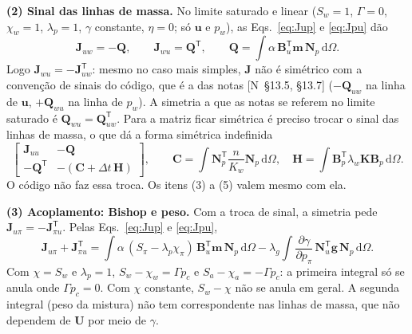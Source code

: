 \documentclass[11pt,a4paper]{article}
\numberwithin{equation}{section}
\newcommand{\dd}{\mathrm{d}}
\newcommand{\nota}[1]{{\footnotesize\textsf{[N~#1]}}}
\begin{document}
\textbf{(2) Sinal das linhas de massa.} No limite saturado e linear ($S_w=1$, $\Gamma=0$, $\chi_w=1$, $\lambda_p=1$,
$\gamma$ constante, $\eta=0$; só $\mathbf u$ e $p_w$), as Eqs.~\eqref{eq:Jup} e \eqref{eq:Jpu} dão
\begin{equation}
\mathbf J_{uw}=-\mathbf Q,\qquad \mathbf J_{wu}=\mathbf Q^{\mathsf T},\qquad
\mathbf Q=\int\alpha\,\mathbf B_u^{\mathsf T}\mathbf m\,\mathbf N_p\,\dd\Omega .
\label{eq:Qsat}
\end{equation}
Logo $\mathbf J_{wu}=-\mathbf J_{uw}^{\mathsf T}$: mesmo no caso mais simples, $\mathbf J$ não é simétrico com a convenção
de sinais do código, que é a das notas \nota{§13.5, §13.7} ($-\mathbf Q_{uw}$ na linha de $\mathbf u$, $+\mathbf Q_{wu}$ na linha
de $p_w$). A simetria a que as notas se referem no limite saturado é $\mathbf Q_{wu}=\mathbf Q_{uw}^{\mathsf T}$. Para a matriz
ficar simétrica é preciso trocar o sinal das linhas de massa, o que dá a forma simétrica indefinida
\begin{equation}
\begin{bmatrix}\mathbf J_{uu}&-\mathbf Q\\-\mathbf Q^{\mathsf T}&-(\mathbf C+\Delta t\,\mathbf H)\end{bmatrix},\qquad
\mathbf C=\int\mathbf N_p^{\mathsf T}\frac{n}{K_w}\mathbf N_p\,\dd\Omega,\quad
\mathbf H=\int\mathbf B_p^{\mathsf T}\lambda_w\mathbf K\mathbf B_p\,\dd\Omega .
\label{eq:Jsimsat}
\end{equation}
O código não faz essa troca. Os itens (3) a (5) valem mesmo com ela.

\textbf{(3) Acoplamento: Bishop e peso.} Com a troca de sinal, a simetria pede $\mathbf J_{u\pi}=-\mathbf J_{\pi u}^{\mathsf T}$.
Pelas Eqs.~\eqref{eq:Jup} e \eqref{eq:Jpu},
\begin{equation}
\mathbf J_{u\pi}+\mathbf J_{\pi u}^{\mathsf T}=\int\alpha\,(S_\pi-\lambda_p\chi_\pi)\,\mathbf B_u^{\mathsf T}\mathbf m\,\mathbf N_p\,\dd\Omega
-\lambda_g\int\frac{\partial\gamma}{\partial p_\pi}\,\mathbf N_u^{\mathsf T}\mathbf g\,\mathbf N_p\,\dd\Omega .
\label{eq:assimup}
\end{equation}
Com $\chi=S_w$ e $\lambda_p=1$, $S_w-\chi_w=\Gamma p_c$ e $S_a-\chi_a=-\Gamma p_c$: a primeira integral só se anula onde
$\Gamma p_c=0$. Com $\chi$ constante, $S_w-\chi$ não se anula em geral. A segunda integral (peso da mistura) não tem
correspondente nas linhas de massa, que não dependem de $\mathbf U$ por meio de $\gamma$.
\end{document}
